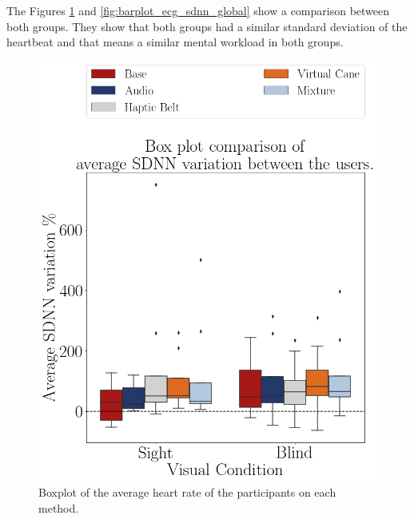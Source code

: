 The Figures \ref{fig:boxplot_ecg_sdnn_box_scene} and \ref{fig:barplot_ecg_sdnn_global} show a comparison between both groups. They show that both groups had a similar standard deviation of the heartbeat and that means a similar mental workload in both groups.

\begin{figure}[!htb]
    \begin{minipage}{.45\linewidth}
        \centering
        \includegraphics[width = \linewidth]{Resultados/ECG/Figuras/png/boxplot_ecg_sdnn_box_scene.png}
        \caption{Boxplot of the average heart rate of the participants on each method.}
        \label{fig:boxplot_ecg_sdnn_box_scene}
    \end{minipage}
    \begin{minipage}{.1\linewidth}
        \hfill
    \end{minipage}
    \begin{minipage}{.45\linewidth}
        \vspace{1.8cm}

\end{minipage}
\end{figure}
